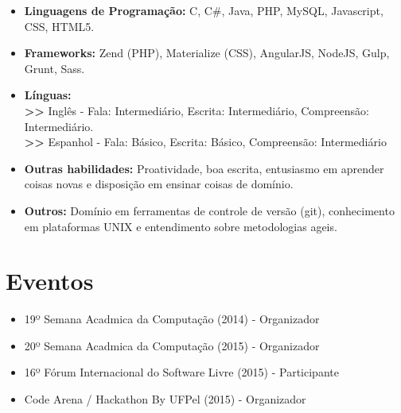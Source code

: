 \documentclass[11pt,a4paper,sans]{moderncv}        %
\begin{document}
\vspace{6pt}

\begin{itemize}

\item \textbf{Linguagens de Programação:} C, C\#, Java, PHP, MySQL, Javascript, CSS, HTML5.
\item \textbf{Frameworks:} Zend (PHP), Materialize (CSS), AngularJS, NodeJS, Gulp, Grunt, Sass.

\vspace{6pt}

\item \textbf{Línguas:}
\\\textbf{>>} Inglês - Fala: Intermediário, Escrita: Intermediário, Compreensão: Intermediário. 
\\\textbf{>>} Espanhol - Fala: Básico, Escrita: Básico, Compreensão: Intermediário 

\vspace{6pt}

\item \textbf{Outras habilidades:} Proatividade, boa escrita, entusiasmo em aprender coisas novas e disposição em ensinar coisas de domínio.

\vspace{6pt}

\item \textbf{Outros:} Domínio em ferramentas de controle de versão (git), conhecimento em plataformas UNIX e entendimento sobre metodologias ageis.

\end{itemize}


\section{Eventos}

\vspace{6pt}
 
\begin{itemize}

\item{19º Semana Acadmica da Computação (2014) - Organizador}
\item{20º Semana Acadmica da Computação (2015)  - Organizador}
\item{16º Fórum Internacional do Software Livre (2015) - Participante}
\item{Code Arena / Hackathon By UFPel (2015) - Organizador}
\end{itemize}
\end{document}
